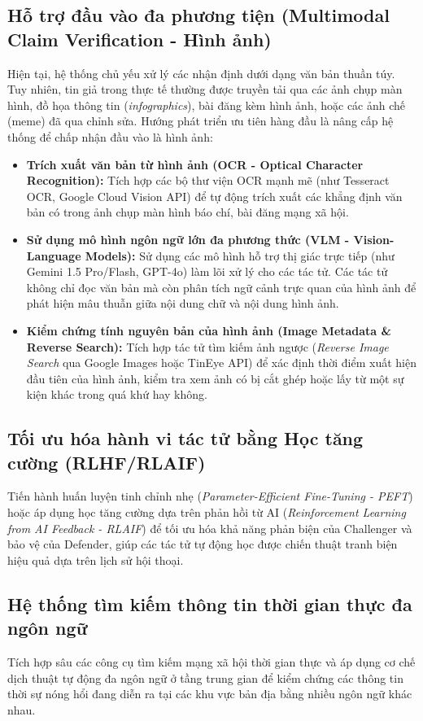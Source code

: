 \documentclass[12pt,a4paper]{report}
\begin{document}
\subsection{Hỗ trợ đầu vào đa phương tiện (Multimodal Claim Verification - Hình ảnh)}
Hiện tại, hệ thống chủ yếu xử lý các nhận định dưới dạng văn bản thuần túy. Tuy nhiên, tin giả trong thực tế thường được truyền tải qua các ảnh chụp màn hình, đồ họa thông tin (\textit{infographics}), bài đăng kèm hình ảnh, hoặc các ảnh chế (meme) đã qua chỉnh sửa. Hướng phát triển ưu tiên hàng đầu là nâng cấp hệ thống để chấp nhận đầu vào là hình ảnh:
\begin{itemize}
    \item \textbf{Trích xuất văn bản từ hình ảnh (OCR - Optical Character Recognition):} Tích hợp các bộ thư viện OCR mạnh mẽ (như Tesseract OCR, Google Cloud Vision API) để tự động trích xuất các khẳng định văn bản có trong ảnh chụp màn hình báo chí, bài đăng mạng xã hội.
    \item \textbf{Sử dụng mô hình ngôn ngữ lớn đa phương thức (VLM - Vision-Language Models):} Sử dụng các mô hình hỗ trợ thị giác trực tiếp (như Gemini 1.5 Pro/Flash, GPT-4o) làm lõi xử lý cho các tác tử. Các tác tử không chỉ đọc văn bản mà còn phân tích ngữ cảnh trực quan của hình ảnh để phát hiện mâu thuẫn giữa nội dung chữ và nội dung hình ảnh.
    \item \textbf{Kiểm chứng tính nguyên bản của hình ảnh (Image Metadata \& Reverse Search):} Tích hợp tác tử tìm kiếm ảnh ngược (\textit{Reverse Image Search} qua Google Images hoặc TinEye API) để xác định thời điểm xuất hiện đầu tiên của hình ảnh, kiểm tra xem ảnh có bị cắt ghép hoặc lấy từ một sự kiện khác trong quá khứ hay không.
\end{itemize}

\subsection{Tối ưu hóa hành vi tác tử bằng Học tăng cường (RLHF/RLAIF)}
Tiến hành huấn luyện tinh chỉnh nhẹ (\textit{Parameter-Efficient Fine-Tuning - PEFT}) hoặc áp dụng học tăng cường dựa trên phản hồi từ AI (\textit{Reinforcement Learning from AI Feedback - RLAIF}) để tối ưu hóa khả năng phản biện của Challenger và bảo vệ của Defender, giúp các tác tử tự động học được chiến thuật tranh biện hiệu quả dựa trên lịch sử hội thoại.

\subsection{Hệ thống tìm kiếm thông tin thời gian thực đa ngôn ngữ}
Tích hợp sâu các công cụ tìm kiếm mạng xã hội thời gian thực và áp dụng cơ chế dịch thuật tự động đa ngôn ngữ ở tầng trung gian để kiểm chứng các thông tin thời sự nóng hổi đang diễn ra tại các khu vực bản địa bằng nhiều ngôn ngữ khác nhau.
\end{document}
